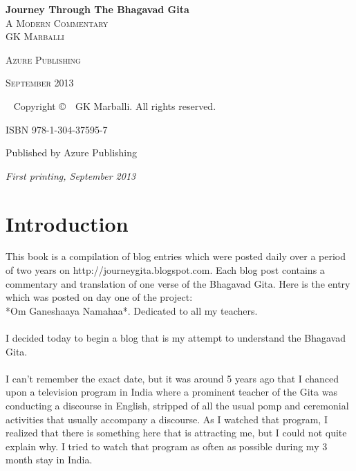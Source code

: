 \documentclass[a5paper,9pt,openany]{memoir}
\newlength\drop
\newcommand*\titleM{\begingroup%
\setlength\drop{0.08\textheight}
\centering
\vspace*{\drop}
{\Huge\bfseries Journey Through The Bhagavad Gita}\\[\baselineskip]
{\scshape A Modern Commentary}\\[\baselineskip]
\vfill
{\large\scshape GK Marballi}\par
\vfill
{\scshape Azure Publishing}\par
{\scshape September 2013}\par
\vspace*{2\drop}
\endgroup}
\begin{document}
\pagestyle{simple}

\frontmatter

\begin{titlingpage}
\titleM
\newpage

~\vfill
Copyright \copyright\ \the\year\ GK Marballi. All rights reserved.\\
\par
ISBN 978-1-304-37595-7\\

\par Published by Azure Publishing\\

\par \textit{First printing, September 2013}\\
\end{titlingpage}

\newpage
\tableofcontents

\newpage

\mainmatter

\chapter*{Introduction}
This book is a compilation of blog entries which were posted daily over a period of two years on http://journeygita.blogspot.com. Each blog post contains a commentary and translation of one verse of the Bhagavad Gita. Here is the entry which was posted on day one of the project:\\

*Om Ganeshaaya Namahaa*. Dedicated to all my teachers.\\

~\\I decided today to begin a blog that is my attempt to understand the Bhagavad Gita.\\

~\\I can't remember the exact date, but it was around 5 years ago that I chanced upon a television program in India where a prominent teacher of the Gita was conducting a discourse in English, stripped of all the usual pomp and ceremonial activities that usually accompany a discourse. As I watched that program, I realized that there is something here that is attracting me, but I could not quite explain why. I tried to watch that program as often as possible during my 3 month stay in India.\\
\end{document}
